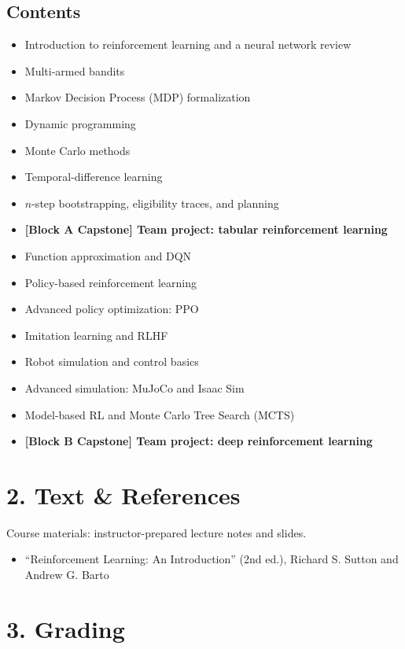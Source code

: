 \documentclass[11pt]{article}
\begin{document}
\subsection*{Contents}
\begin{itemize}[nosep]
\item Introduction to reinforcement learning and a neural network review
\item Multi-armed bandits
\item Markov Decision Process (MDP) formalization
\item Dynamic programming
\item Monte Carlo methods
\item Temporal-difference learning
\item $n$-step bootstrapping, eligibility traces, and planning
\item \textbf{[Block A Capstone] Team project: tabular reinforcement
  learning}
\item Function approximation and DQN
\item Policy-based reinforcement learning
\item Advanced policy optimization: PPO
\item Imitation learning and RLHF
\item Robot simulation and control basics
\item Advanced simulation: MuJoCo and Isaac Sim
\item Model-based RL and Monte Carlo Tree Search (MCTS)
\item \textbf{[Block B Capstone] Team project: deep reinforcement
  learning}
\end{itemize}


\section*{2. Text \& References}
Course materials: instructor-prepared lecture notes and slides.
\begin{itemize}[nosep]
\item ``Reinforcement Learning: An Introduction'' (2nd ed.), Richard S.
  Sutton and Andrew G. Barto
\end{itemize}

\section*{3. Grading}
\end{document}

